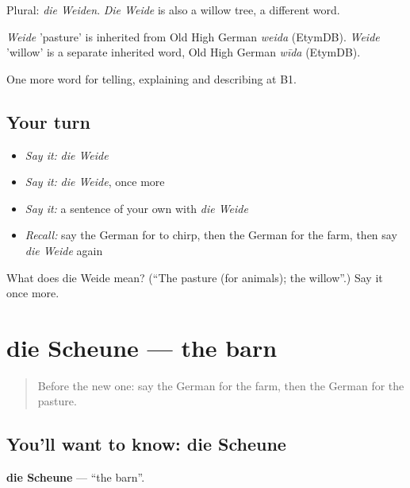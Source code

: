 Plural: \emph{die Weiden}. \emph{Die Weide} is also a willow tree, a different word.

\begin{cousinweb}
\emph{Weide} 'pasture' is inherited from Old High German \emph{weida} (EtymDB). \emph{Weide} 'willow' is a separate inherited word, Old High German \emph{wīda} (EtymDB).
\end{cousinweb}

\begin{grammarlens}[title={What you've built}]
One more word for telling, explaining and describing at B1.
\end{grammarlens}

\subsection*{Your turn}
\begin{itemize}
\raggedright
  \item \emph{Say it:} \emph{die Weide}
  \item \emph{Say it:} \emph{die Weide}, once more
  \item \emph{Say it:} a sentence of your own with \emph{die Weide}
  \item \emph{Recall:} say the German for to chirp, then the German for the farm, then say \emph{die Weide} again
\end{itemize}

\begin{tcolorbox}[breakable,colback=teal!4,colframe=teal!35!black,title={Before you move on}]
What does die Weide mean? (\textquotedblleft{}The pasture (for animals); the willow\textquotedblright{}.) Say it once more.
\end{tcolorbox}
\section[die Scheune]{die Scheune — the barn}

\label{lesson:GE-C459-scheune}



\begin{quote}
Before the new one: say the German for the farm, then the German for the pasture.
\end{quote}

\subsection*{You'll want to know: die Scheune}
\textbf{die Scheune} — \textquotedblleft{}the barn\textquotedblright{}.

